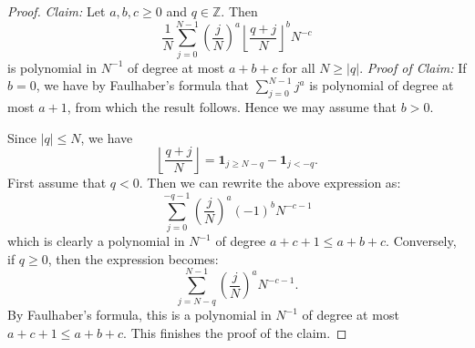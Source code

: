 \documentclass[11pt]{article}
\theoremstyle{definition}
\begin{document}
\begin{proof}
	\emph{Claim:} Let $a,b,c\ge 0$ and $q\in \mathbb{Z}$. Then
	$$\frac{1}{N}\sum_{j=0}^{N-1}\left(\frac{j}{N}\right)^{a}\left\lfloor \frac{q+j}{N}\right\rfloor^{b}N^{-c}$$
	is polynomial in $N^{-1}$ of degree at most $a+b+c$ for all
	$N\ge |q|$.
	\emph{Proof of Claim:} If $b=0$, we have by Faulhaber's formula
	that $\sum_{j=0}^{N-1}j^{a}$ is polynomial of degree at most $a+1$,
	from which the result follows. Hence we may assume that $b>0$.

	Since $|q|\le N$, we have
	$$\left\lfloor \frac{q+j}{N}\right\rfloor=\mathbf{1}_{j\ge N-q}-\mathbf{1}_{j< -q}.$$
	First assume that $q<0$. Then we can rewrite the above expression as:
	$$\sum_{j=0}^{-q-1}\left(\frac{j}{N}\right)^{a}(-1)^{b}N^{-c-1}$$
	which is clearly a polynomial in $N^{-1}$ of degree $a+c+1\le a+b+c$.
	Conversely, if $q\ge 0$, then the expression becomes:
	$$\sum_{j=N-q}^{N-1}\left(\frac{j}{N}\right)^{a}N^{-c-1}.$$
	By Faulhaber's formula, this is a polynomial in $N^{-1}$ of
	degree at most $a+c+1\le a+b+c$. This finishes the proof of the
	claim.


\end{proof}
\end{document}
